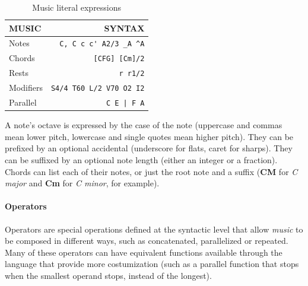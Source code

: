 \documentclass[a4paper,UKenglish,cleveref, autoref]{oasics-v2019}
\begin{document}
\begin{table}[h]
\centering
\def\arraystretch{1.2}
\begin{tabular*}{\textwidth}{@{\extracolsep{\fill}}|l|r|}
\hline
\textbf{MUSIC}             & \textbf{SYNTAX} \\ \hline
Notes                      & \verb|C, C c c' A2/3 _A ^A| \\ \hline
Chords                     & \verb|[CFG] [Cm]/2| \\ \hline
Rests                      & \verb|r r1/2| \\ \hline
Modifiers                  & \verb|S4/4 T60 L/2 V70 O2 I2| \\ \hline
Parallel                   & \texttt{C E | F A} \\ \hline
\end{tabular*}
\caption{Music literal expressions}
\label{tab:syntax-music}
\end{table}
A note's octave is expressed by the case of the note (uppercase and commas mean lower pitch, lowercase and single quotes mean higher pitch). They can be prefixed by an optional accidental (underscore for flats, caret for sharps). They can be suffixed by an optional note length (either an integer or a fraction). Chords can list each of their notes, or just the root note and a suffix (\textbf{CM} for \textit{C major} and \textbf{Cm} for \textit{C minor}, for example).

\paragraph*{Operators}
Operators are special operations defined at the syntactic level that allow \textit{music} to be composed in different ways, such as concatenated, parallelized or repeated. Many of these operators can have equivalent functions available through the language that provide more costumization (such as a parallel function that stops when the smallest operand stops, instead of the longest).
\end{document}
